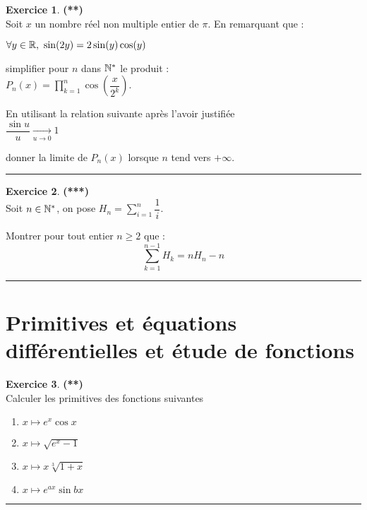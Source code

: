 \documentclass[a4paper,11pt]{article}
\theoremstyle{definition}
\newtheorem{exo}{Exercice} %
\begin{document}
\begin{exo}\textbf{(**)}\quad\\[0.2cm]
	
	\noindent Soit $x$ un nombre réel non multiple
	entier de $\pi$. En remarquant que :\quad\\[0.25cm]
	
	\centering
	
	$\forall y\in\mathbb{R}, \ \sin(2y)= 2\sin(y)\cos(y)$\quad\\[0.25cm]
	
	
	
	\raggedright simplifier pour $n$ dans $\mathbb{N}^*$ le produit :\quad\\[0.25cm]
	
	\centering$ P_n(x) = \displaystyle\prod\limits_{k=1}^{n}{\cos\left(\dfrac{x}{2^k}\right)}$.\quad\\[0.25cm]
	
	\raggedright En utilisant la relation suivante après l’avoir justifiée \quad\\[0.25cm]
	
	\centering$ \dfrac{\sin u}{u} \underset{u \rightarrow 0}{\longrightarrow} 1$\quad\\[0.25cm]
	
	\raggedright donner la limite de $P_n(x)$ lorsque $n$ tend vers $+\infty$.
	
	\centering
	\rule{1\linewidth}{0.6pt}
\end{exo}

	\begin{exo}\textbf{(***)}\quad\\[0.2cm]
	Soit $n\in\mathbb{N}^*$, on pose $\displaystyle H_n = \sum_{i=1}^{n}\dfrac{1}{i}$.

	\noindent Montrer pour tout entier $n \geq 2$ que :
	$$\sum_{k=1}^{n-1}{H_k}=n H_n - n$$
	\centering
	\rule{1\linewidth}{0.6pt}
\end{exo}

\newpage

\section{Primitives et équations différentielles et étude de fonctions}

\begin{exo}\textbf{(**)}\quad\\[0.2cm]
	Calculer les primitives des fonctions suivantes
	\begin{multicols}{2}
		\begin{enumerate}
			\item $x\mapsto e^x \cos x $
			\item $x\mapsto \sqrt{e^x -1} $
			\item $x\mapsto x \sqrt[3]{1 + x } $
			\item $x \mapsto e^{ax} \sin b x $
		\end{enumerate}
	\end{multicols}
	
	\centering
	\rule{1\linewidth}{0.6pt}
\end{exo}
\end{document}
